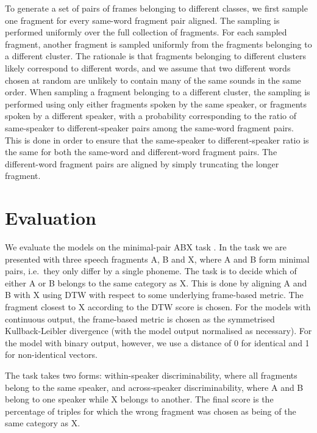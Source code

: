 To generate a set of pairs of frames belonging to different classes, we first sample one fragment for every same-word fragment pair aligned.
The sampling is performed uniformly over the full collection of fragments.
For each sampled fragment, another fragment is sampled uniformly from the fragments belonging to a different cluster.
The rationale is that fragments belonging to different clusters likely correspond to different words, and we assume that two different words chosen at random are unlikely to contain many of the same sounds in the same order.
When sampling a fragment belonging to a different cluster, the sampling is performed using only either fragments spoken by the same speaker, or fragments spoken by a different speaker, with a probability corresponding to the ratio of same-speaker to different-speaker pairs among the same-word fragment pairs.
This is done in order to ensure that the same-speaker to different-speaker ratio is the same for both the same-word and different-word fragment pairs.
The different-word fragment pairs are aligned by simply truncating the longer fragment.

\section{Evaluation}

We evaluate the models on the minimal-pair ABX task \parencite{schatz2013evaluating}.
In the task we are presented with three speech fragments A, B and X, where A and B form minimal pairs, i.e.\ they only differ by a single phoneme.
The task is to decide which of either A or B belongs to the same category as X.
This is done by aligning A and B with X using DTW with respect to some underlying frame-based metric.
The fragment closest to X according to the DTW score is chosen.
For the models with continuous output, the frame-based metric is chosen as the symmetrised Kullback-Leibler divergence (with the model output normalised as necessary).
For the model with binary output, however, we use a distance of 0 for identical and 1 for non-identical vectors.

The task takes two forms: within-speaker discriminability, where all fragments belong to the same speaker, and across-speaker discriminability, where A and B belong to one speaker while X belongs to another.
The final score is the percentage of triples for which the wrong fragment was chosen as being of the same category as X.
